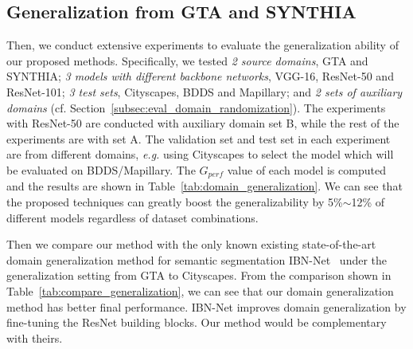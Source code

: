 \documentclass[10pt,twocolumn,letterpaper]{article}
\begin{document}
\begin{table}[t]
{\begin{tabular}{l|l||c|c|c|c}
                                             \hline


\end{tabular}
}

\end{table}




\subsection{Generalization from GTA and SYNTHIA}
\label{subsec:generalization}
Then, we conduct extensive experiments to evaluate the generalization ability of our proposed methods. Specifically, we tested \textit{2 source domains}, GTA and SYNTHIA; \textit{3 models with different backbone networks}, VGG-16, ResNet-50 and ResNet-101; \textit{3 test sets}, Cityscapes, BDDS and Mapillary; and \textit{2 sets of auxiliary domains} (cf. Section~\ref{subsec:eval_domain_randomization}). The experiments with ResNet-50 are conducted with auxiliary domain set B, while the rest of the experiments are with set A. The validation set and test set in each experiment are from different domains, \textit{e.g.} using Cityscapes to select the model which will be evaluated on BDDS/Mapillary. 
The $G_{perf}$ value of each model is computed and the results are shown in Table~\ref{tab:domain_generalization}. We can see that the proposed techniques can greatly boost the generalizability by 5\%$\sim$12\% of different models regardless of dataset combinations. 

Then we compare our method with the only known existing state-of-the-art domain generalization method for semantic segmentation IBN-Net~\cite{pan2018twoatonce} under the generalization setting from GTA to Cityscapes. From the comparison shown in Table~\ref{tab:compare_generalization}, we can see that our domain generalization method has better final performance. IBN-Net improves domain generalization by fine-tuning the ResNet building blocks. Our method would be complementary with theirs.
\end{document}

